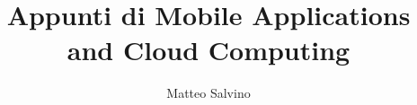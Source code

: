 \documentclass[12pt]{report}
\title{Appunti di Mobile Applications and Cloud Computing}
\author{Matteo Salvino}
\date{}
\begin{document}
\maketitle
\tableofcontents
\pagebreak








\end{document}
